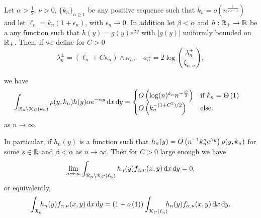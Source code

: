 \begin{lemma}\label{lem:concentration_argument}
Let $\alpha > \frac{1}{2}$, $\nu > 0$, $\{k_n\}_{n \ge 1}$ be any positive sequence such that $k_n = o(n^{\frac{1}{2\alpha + 1}})$ and let $\ell_n = k_n(1 + \epsilon_n)$, with $\epsilon_n \to 0$. In addition let $\beta < \alpha$ and $h : {\mathbb R}_+ \rightarrow  {\ensuremath{\mathbb R}}$ be a any function such that $h(y) = g(y)e^{\beta y}$ with $|g(y)|$ uniformly bounded on ${\mathbb R}_+$. Then, if we define for $C > 0$
\[
	\lambda_n^\pm = (\ell_n \pm C \kappa_n) \wedge \kappa_n, 
	\quad a_n^\pm = 2 \log\left(\frac{\lambda_n^\pm}{\xi_{\alpha,\nu}}\right),
\] 

we have
\begin{equation}\label{eq:error_bound_int_rho_not_K}
\begin{aligned}
	\int_{{\mathcal R}_n\setminus {\mathcal K}_{C}(k_n)} \rho(y,k_n) h(y) \alpha e^{-\alpha y} \operatorname{\mathrm{d}\hspace{-2pt}} x \operatorname{\mathrm{d}\hspace{-2pt}} y
	&= \begin{cases}
		O\left(\log(n)^{k_n} n^{-\frac{C}{2}}\right) &\mbox{if } k_n = \Theta\left(1\right) \\
		O\left(k_n^{-(1+C^2)/2}\right) &\mbox{else.}
	\end{cases}
\end{aligned}
\end{equation}
as $n \to \infty$. 

In particular, if $h_n(y)$ is a function such that $h_n(y) = O\left(n^{-1} k_n^{s} e^{\beta y}\right)\rho(y,k_n)$ for some $s \in {\ensuremath{\mathbb R}}$ and $\beta < \alpha$ as $n \to \infty$. Then for $C > 0$ large enough we have
\[
	\lim_{n \to \infty} \int_{{\mathcal R}_n \setminus {\mathcal K}_{C}(\ell_n)} h_n(y) f_{\alpha,\nu}(x,y) \operatorname{\mathrm{d}\hspace{-2pt}} x\operatorname{\mathrm{d}\hspace{-2pt}} y = 0,
\]
or equivalently,
\[
	\int_{{\mathcal R}_n} \hspace{-5pt} h_n(y) f_{\alpha,\nu}(x,y) \operatorname{\mathrm{d}\hspace{-2pt}} x \operatorname{\mathrm{d}\hspace{-2pt}} y
	= (1+o\left(1\right)) \int_{{\mathcal K}_{C}(\ell_n)} \hspace{-5pt} h_n(y) f_{\alpha,\nu}(x,y) \operatorname{\mathrm{d}\hspace{-2pt}} x \operatorname{\mathrm{d}\hspace{-2pt}} y.
\]
\end{lemma}

